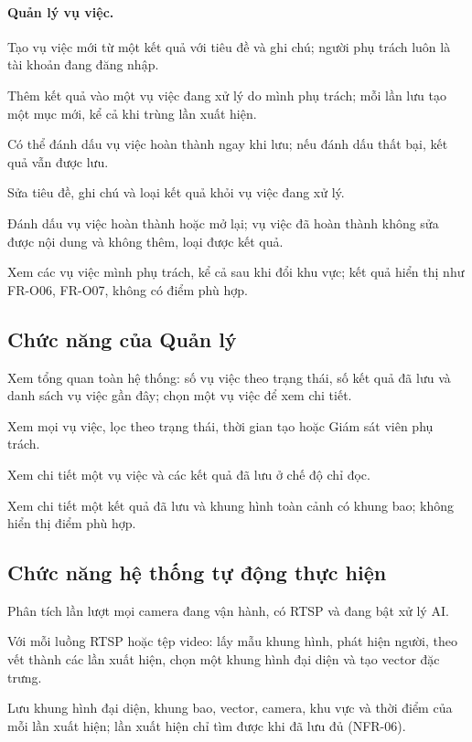 \paragraph{Quản lý vụ việc.}
\begin{reqlist}
    \item[FR-O09] Tạo vụ việc mới từ một kết quả với tiêu đề và ghi chú; người phụ trách luôn là tài khoản đang đăng nhập.
    \item[FR-O10] Thêm kết quả vào một vụ việc đang xử lý do mình phụ trách; mỗi lần lưu tạo một mục mới, kể cả khi trùng lần xuất hiện.
    \item[FR-O11] Có thể đánh dấu vụ việc hoàn thành ngay khi lưu; nếu đánh dấu thất bại, kết quả vẫn được lưu.
    \item[FR-O12] Sửa tiêu đề, ghi chú và loại kết quả khỏi vụ việc đang xử lý.
    \item[FR-O13] Đánh dấu vụ việc hoàn thành hoặc mở lại; vụ việc đã hoàn thành không sửa được nội dung và không thêm, loại được kết quả.
    \item[FR-O14] Xem các vụ việc mình phụ trách, kể cả sau khi đổi khu vực; kết quả hiển thị như FR-O06, FR-O07, không có điểm phù hợp.
\end{reqlist}

\subsection{Chức năng của Quản lý}
\label{sec:4.2.4}

\begin{reqlist}
    \item[FR-V01] Xem tổng quan toàn hệ thống: số vụ việc theo trạng thái, số kết quả đã lưu và danh sách vụ việc gần đây; chọn một vụ việc để xem chi tiết.
    \item[FR-V02] Xem mọi vụ việc, lọc theo trạng thái, thời gian tạo hoặc Giám sát viên phụ trách.
    \item[FR-V03] Xem chi tiết một vụ việc và các kết quả đã lưu ở chế độ chỉ đọc.
    \item[FR-V04] Xem chi tiết một kết quả đã lưu và khung hình toàn cảnh có khung bao; không hiển thị điểm phù hợp.
\end{reqlist}

\subsection{Chức năng hệ thống tự động thực hiện}
\label{sec:4.2.5}

\begin{reqlist}
    \item[FR-S01] Phân tích lần lượt mọi camera đang vận hành, có RTSP và đang bật xử lý AI.
    \item[FR-S02] Với mỗi luồng RTSP hoặc tệp video: lấy mẫu khung hình, phát hiện người, theo vết thành các lần xuất hiện, chọn một khung hình đại diện và tạo vector đặc trưng.
    \item[FR-S03] Lưu khung hình đại diện, khung bao, vector, camera, khu vực và thời điểm của mỗi lần xuất hiện; lần xuất hiện chỉ tìm được khi đã lưu đủ (NFR-06).
\end{reqlist}
